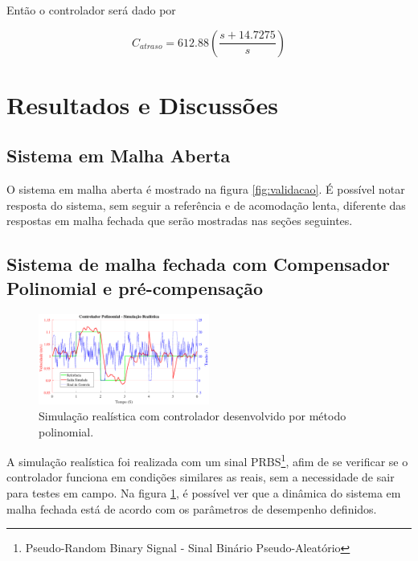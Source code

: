 \documentclass[conference,harvard,brazil,english]{sbatex}
\begin{document}
            Então o controlador será dado por
            
            \begin{equation}
                \label{equ:controladorematraso}
                C_{atraso} = 612.88 \left(\frac{s + 14.7275}{s}\right)
            \end{equation}
    
    \section{Resultados e Discussões}
    
        \subsection{Sistema em Malha Aberta}
        
        O sistema em malha aberta é mostrado na figura \ref{fig:validacao}. É possível notar resposta do sistema, sem seguir a referência e de acomodação lenta, diferente das respostas em malha fechada que serão mostradas nas seções seguintes.
    
        \subsection{Sistema de malha fechada com Compensador Polinomial e pré-compensação}
        
            \begin{figure}[H]
                \centering
                \includegraphics[width=0.5\textwidth]{imagens/polinomial/simulacaoRealisticaPolinomial.eps}
                \caption{Simulação realística com controlador desenvolvido por método polinomial.}
                \label{fig:cont_poli_simu}
            \end{figure}
            
            A simulação realística foi realizada com um sinal PRBS\footnote{Pseudo-Random Binary Signal - Sinal Binário Pseudo-Aleatório}, afim de se verificar se o controlador funciona em condições similares as reais, sem a necessidade de sair para testes em campo.
            Na figura \ref{fig:cont_poli_simu}, é possível ver que a dinâmica do sistema em malha fechada está de acordo com os parâmetros de desempenho definidos.
            
\end{document}
